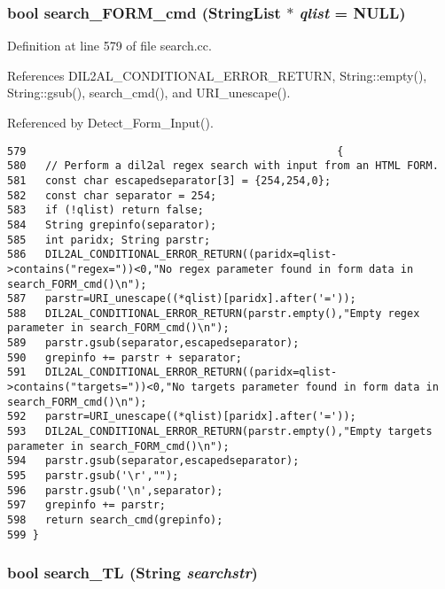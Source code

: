 \subsubsection{\setlength{\rightskip}{0pt plus 5cm}bool search\_\-FORM\_\-cmd ({\bf String\-List} $\ast$ {\em qlist} = NULL)}\label{dil2al_8hh_a366}




Definition at line 579 of file search.cc.

References DIL2AL\_\-CONDITIONAL\_\-ERROR\_\-RETURN, String::empty(), String::gsub(), search\_\-cmd(), and URI\_\-unescape().

Referenced by Detect\_\-Form\_\-Input().



\footnotesize\begin{verbatim}579                                                 {
580   // Perform a dil2al regex search with input from an HTML FORM.
581   const char escapedseparator[3] = {254,254,0};
582   const char separator = 254;
583   if (!qlist) return false;
584   String grepinfo(separator);
585   int paridx; String parstr;
586   DIL2AL_CONDITIONAL_ERROR_RETURN((paridx=qlist->contains("regex="))<0,"No regex parameter found in form data in search_FORM_cmd()\n");
587   parstr=URI_unescape((*qlist)[paridx].after('='));
588   DIL2AL_CONDITIONAL_ERROR_RETURN(parstr.empty(),"Empty regex parameter in search_FORM_cmd()\n");
589   parstr.gsub(separator,escapedseparator);
590   grepinfo += parstr + separator;
591   DIL2AL_CONDITIONAL_ERROR_RETURN((paridx=qlist->contains("targets="))<0,"No targets parameter found in form data in search_FORM_cmd()\n");
592   parstr=URI_unescape((*qlist)[paridx].after('='));
593   DIL2AL_CONDITIONAL_ERROR_RETURN(parstr.empty(),"Empty targets parameter in search_FORM_cmd()\n");
594   parstr.gsub(separator,escapedseparator);
595   parstr.gsub('\r',"");
596   parstr.gsub('\n',separator);
597   grepinfo += parstr;
598   return search_cmd(grepinfo);
599 }
\end{verbatim}\normalsize 
{}
\subsubsection{\setlength{\rightskip}{0pt plus 5cm}bool search\_\-TL ({\bf String} {\em searchstr})}\label{dil2al_8hh_a344}




